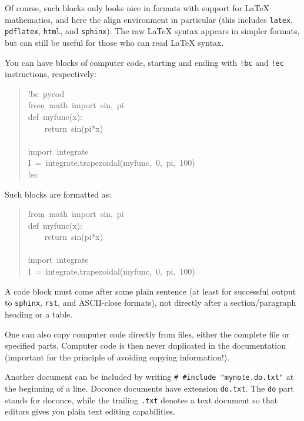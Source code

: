 \documentclass[a4paper]{article}
\begin{document}
Of course, such blocks only looks nice in formats with support
for LaTeX mathematics, and here the align environment in particular
(this includes \texttt{latex}, \texttt{pdflatex}, \texttt{html}, and \texttt{sphinx}). The raw
LaTeX syntax appears in simpler formats, but can still be useful
for those who can read LaTeX syntax.

You can have blocks of computer code, starting and ending with
\texttt{!bc} and \texttt{!ec} instructions, respectively:
%
\begin{quote}{\ttfamily \raggedright \noindent
!bc~pycod\\
from~math~import~sin,~pi\\
def~myfunc(x):\\
~~~~return~sin(pi*x)\\
~\\
import~integrate\\
I~=~integrate.trapezoidal(myfunc,~0,~pi,~100)\\
!ec
}
\end{quote}

Such blocks are formatted as:
%
\begin{quote}{\ttfamily \raggedright \noindent
from~math~import~sin,~pi\\
def~myfunc(x):\\
~~~~return~sin(pi*x)\\
~\\
import~integrate\\
I~=~integrate.trapezoidal(myfunc,~0,~pi,~100)
}
\end{quote}

A code block must come after some plain sentence (at least for successful
output to \texttt{sphinx}, \texttt{rst}, and ASCII-close formats),
not directly after a section/paragraph heading or a table.

One can also copy computer code directly from files, either the
complete file or specified parts.  Computer code is then never
duplicated in the documentation (important for the principle of
avoiding copying information!).

Another document can be included by writing \texttt{\# \#include "mynote.do.txt"}
at the beginning of a line.  Doconce documents have
extension \texttt{do.txt}. The \texttt{do} part stands for doconce, while the
trailing \texttt{.txt} denotes a text document so that editors gives you
plain text editing capabilities.


\end{document}
